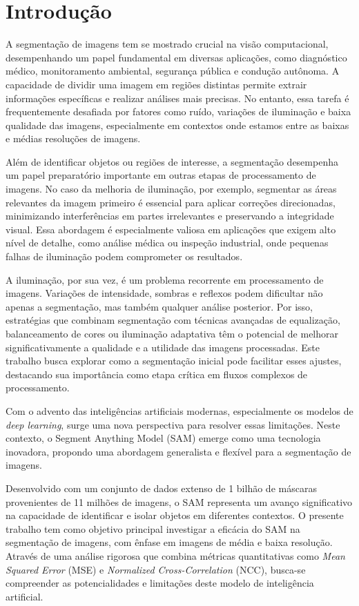 \chapter {Introdução}
\label{cap:01}

A segmentação de imagens tem se mostrado crucial na visão computacional, desempenhando um papel fundamental em diversas aplicações, como diagnóstico médico, monitoramento ambiental, segurança pública e condução autônoma. A capacidade de dividir uma imagem em regiões distintas permite extrair informações específicas e realizar análises mais precisas. No entanto, essa tarefa é frequentemente desafiada por fatores como ruído, variações de iluminação e baixa qualidade das imagens, especialmente em contextos onde estamos entre as baixas e médias resoluções de imagens.

Além de identificar objetos ou regiões de interesse, a segmentação desempenha um papel preparatório importante em outras etapas de processamento de imagens. No caso da melhoria de iluminação, por exemplo, segmentar as áreas relevantes da imagem primeiro é essencial para aplicar correções direcionadas, minimizando interferências em partes irrelevantes e preservando a integridade visual. Essa abordagem é especialmente valiosa em aplicações que exigem alto nível de detalhe, como análise médica ou inspeção industrial, onde pequenas falhas de iluminação podem comprometer os resultados.

A iluminação, por sua vez, é um problema recorrente em processamento de imagens. Variações de intensidade, sombras e reflexos podem dificultar não apenas a segmentação, mas também qualquer análise posterior. Por isso, estratégias que combinam segmentação com técnicas avançadas de equalização, balanceamento de cores ou iluminação adaptativa têm o potencial de melhorar significativamente a qualidade e a utilidade das imagens processadas. Este trabalho busca explorar como a segmentação inicial pode facilitar esses ajustes, destacando sua importância como etapa crítica em fluxos complexos de processamento.

Com o advento das inteligências artificiais modernas, especialmente os modelos de \textit{deep learning}, surge uma nova perspectiva para resolver essas limitações. Neste contexto, o Segment Anything Model (SAM) emerge como uma tecnologia inovadora, propondo uma abordagem generalista e flexível para a segmentação de imagens.

Desenvolvido com um conjunto de dados extenso de 1 bilhão de máscaras provenientes de 11 milhões de imagens, o SAM representa um avanço significativo na capacidade de identificar e isolar objetos em diferentes contextos. O presente trabalho tem como objetivo principal investigar a eficácia do SAM na segmentação de imagens, com ênfase em imagens de média e baixa resolução. Através de uma análise rigorosa que combina métricas quantitativas como \textit{Mean Squared Error} (MSE) e \textit{Normalized Cross-Correlation} (NCC), busca-se compreender as potencialidades e limitações deste modelo de inteligência artificial.

